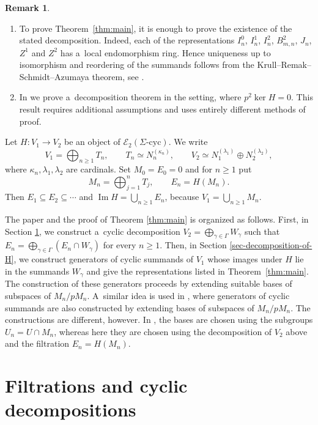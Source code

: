 \documentclass[11pt]{article}
\theoremstyle{definition}
\newtheorem{rem}[thm]{Remark}
\newcommand{\ImH}{\operatorname{Im}}
\begin{document}
\begin{rem}
	\begin{enumerate}
		\item To prove Theorem~\ref{thm:main}, it is enough to prove the existence
		of the stated decomposition. Indeed, each of the representations
		$I_n^0$, $I_n^1$, $I_n^2$, $B_{m,n}^2$, $J_n$, $Z^1$ and $Z^2$ has a~local endomorphism
		ring. Hence uniqueness up to isomorphism and reordering of the
		summands follows from the Krull--Remak--Schmidt--Azumaya theorem,
		see \cite{azumaya,facchini}.
		\item In \cite{kasjan-kosakowska-dual} we prove a~decomposition
		theorem in the setting, where $p^2\ker H=0$.
		This result requires additional assumptions and uses
		entirely different methods of proof.
	\end{enumerate}
\end{rem}

Let $H:V_1\to V_2$ be an object of
$\mathcal E_2(\Sigma\text{-cyc})$. We write
$$
V_1=\bigoplus_{n\geq1}T_n,\qquad
T_n\simeq N_n^{(\kappa_n)},\qquad
V_2\simeq N_1^{(\lambda_1)}\oplus N_2^{(\lambda_2)},
$$
where $\kappa_n,\lambda_1,\lambda_2$ are cardinals.
Set $M_0=E_0=0$ and  for $n\geq1$  put
$$
M_n=\bigoplus_{j=1}^nT_j,\qquad E_n=H(M_n).
$$
Then $E_1\subseteq E_2\subseteq\cdots$ and $\ImH H=\bigcup_{n\geq1}E_n$, because $V_1=\bigcup_{n\geq1}M_n$.


The paper and the proof of Theorem \ref{thm:main} is organized as follows. First, in Section \ref{sec-filtration}, we construct a~cyclic decomposition $V_2=\bigoplus_{\gamma\in\Gamma}W_\gamma$
such that $E_n=\bigoplus_{\gamma\in\Gamma}(E_n\cap W_\gamma)$
for every $n\geq1$. Then, in Section \ref{sec-decomposition-of-H}, we construct generators of cyclic summands
of $V_1$ whose images under $H$ lie in the summands
$W_\gamma$ and give the representations listed in
Theorem~\ref{thm:main}. The construction of these generators proceeds
by extending suitable bases of subspaces of $M_n/pM_n$. A~similar idea is used in \cite[Section~2.3]{kss-SH1}, where generators
of cyclic summands are also constructed by extending bases of
subspaces of $M_n/pM_n$. The constructions are different, however.
In \cite[Section~2.3]{kss-SH1}, the bases are chosen using the
subgroups $U_n=U\cap M_n$, whereas here they are chosen using the
decomposition of $V_2$ above and the filtration $E_n=H(M_n)$.



\section{Filtrations and cyclic decompositions}\label{sec-filtration}
\end{document}
